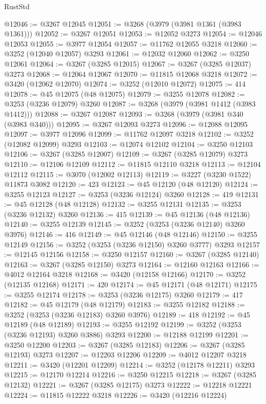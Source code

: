 \begin{lexlean}{RustStd}
\begin{coremodule}
{\begin{coremodule}
{{{{{{{{{{{{{{{{{{{{{{{{{{{{{{{{{{{{{{{@12046 := @3267 @12045
@12051 := @3268 (@3979 (@3981 @1361 (@3983 @1361)))
@12052 := @3267 @12051
@12053 := @12052 @3273
@12054 := @12046 @12053
@12055 := @3977 @12054
@12057 := @11762 @12055 @3218
@12060 := @3252 (@12040 @12057) @3293
@12061 := @12032 @12060
@12062 := @3250 @12061
@12064 := @3267 (@3285 @12015)
@12067 := @3267 (@3285 @12037) @3273
@12068 := @12064 @12067
@12070 := @11815 @12068 @3218
@12072 := @3420 (@12062 @12070)
@12074 := @3252 (@12010 @12072)
@12075 := 414
@12078 := @45 @12075 (@48 @12075)
@12079 := @3255 @12078
@12082 := @3253 (@3236 @12079) @3260
@12087 := @3268 (@3979 (@3981 @1412 (@3983 @1412)))
@12088 := @3267 @12087
@12093 := @3268 (@3979 (@3981 @340 (@3983 @340)))
@12095 := @3267 @12093 @3273
@12096 := @12088 @12095
@12097 := @3977 @12096
@12099 := @11762 @12097 @3218
@12102 := @3252 (@12082 @12099) @3293
@12103 := @12074 @12102
@12104 := @3250 @12103
@12106 := @3267 (@3285 @12007)
@12109 := @3267 (@3285 @12079) @3273
@12110 := @12106 @12109
@12112 := @11815 @12110 @3218
@12113 := @12104 @12112
@12115 := @3070 (@12002 @12113)
@12119 := @3227 (@3230 @1522) @11873 @3082
@12120 := 423
@12123 := @45 @12120 (@48 @12120)
@12124 := @3255 @12123
@12127 := @3253 (@3236 @12124) @3260
@12128 := 419
@12131 := @45 @12128 (@48 @12128)
@12132 := @3255 @12131
@12135 := @3253 (@3236 @12132) @3260
@12136 := 415
@12139 := @45 @12136 (@48 @12136)
@12140 := @3255 @12139
@12145 := @3252 (@3253 (@3236 @12140) @3260 @3976)
@12146 := 416
@12149 := @45 @12146 (@48 @12146)
@12150 := @3255 @12149
@12156 := @3252 (@3253 (@3236 @12150) @3260 @3777) @3293
@12157 := @12145 @12156
@12158 := @3250 @12157
@12160 := @3267 (@3285 @12140)
@12163 := @3267 (@3285 @12150) @3273
@12164 := @12160 @12163
@12166 := @4012 @12164 @3218
@12168 := @3420 (@12158 @12166)
@12170 := @3252 (@12135 @12168)
@12171 := 420
@12174 := @45 @12171 (@48 @12171)
@12175 := @3255 @12174
@12178 := @3253 (@3236 @12175) @3260
@12179 := 417
@12182 := @45 @12179 (@48 @12179)
@12183 := @3255 @12182
@12188 := @3252 (@3253 (@3236 @12183) @3260 @3976)
@12189 := 418
@12192 := @45 @12189 (@48 @12189)
@12193 := @3255 @12192
@12199 := @3252 (@3253 (@3236 @12193) @3260 @3886) @3293
@12200 := @12188 @12199
@12201 := @3250 @12200
@12203 := @3267 (@3285 @12183)
@12206 := @3267 (@3285 @12193) @3273
@12207 := @12203 @12206
@12209 := @4012 @12207 @3218
@12211 := @3420 (@12201 @12209)
@12214 := @3252 (@12178 @12211) @3293
@12215 := @12170 @12214
@12216 := @3250 @12215
@12218 := @3267 (@3285 @12132)
@12221 := @3267 (@3285 @12175) @3273
@12222 := @12218 @12221
@12224 := @11815 @12222 @3218
@12226 := @3420 (@12216 @12224)
}}}}}}}}}}}}}}}}}}}}}}}}}}}}}}}}}}}}}}}
\end{coremodule}}
\end{coremodule}
\end{lexlean}
